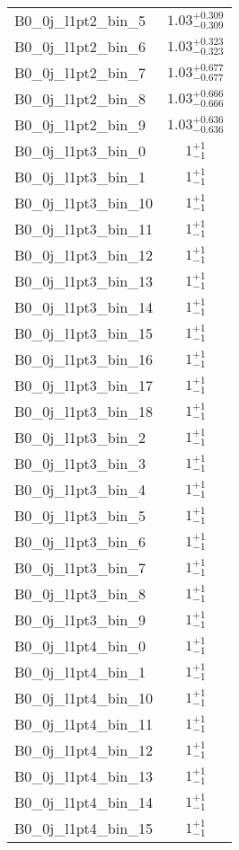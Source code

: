 \begin{tabular}{|l|c|}
B0\_0j\_l1pt2\_bin\_5 & $1.03^{+0.309}_{-0.309}$ \\
B0\_0j\_l1pt2\_bin\_6 & $1.03^{+0.323}_{-0.323}$ \\
B0\_0j\_l1pt2\_bin\_7 & $1.03^{+0.677}_{-0.677}$ \\
B0\_0j\_l1pt2\_bin\_8 & $1.03^{+0.666}_{-0.666}$ \\
B0\_0j\_l1pt2\_bin\_9 & $1.03^{+0.636}_{-0.636}$ \\
B0\_0j\_l1pt3\_bin\_0 & $1^{+1}_{-1}$ \\
B0\_0j\_l1pt3\_bin\_1 & $1^{+1}_{-1}$ \\
B0\_0j\_l1pt3\_bin\_10 & $1^{+1}_{-1}$ \\
B0\_0j\_l1pt3\_bin\_11 & $1^{+1}_{-1}$ \\
B0\_0j\_l1pt3\_bin\_12 & $1^{+1}_{-1}$ \\
B0\_0j\_l1pt3\_bin\_13 & $1^{+1}_{-1}$ \\
B0\_0j\_l1pt3\_bin\_14 & $1^{+1}_{-1}$ \\
B0\_0j\_l1pt3\_bin\_15 & $1^{+1}_{-1}$ \\
B0\_0j\_l1pt3\_bin\_16 & $1^{+1}_{-1}$ \\
B0\_0j\_l1pt3\_bin\_17 & $1^{+1}_{-1}$ \\
B0\_0j\_l1pt3\_bin\_18 & $1^{+1}_{-1}$ \\
B0\_0j\_l1pt3\_bin\_2 & $1^{+1}_{-1}$ \\
B0\_0j\_l1pt3\_bin\_3 & $1^{+1}_{-1}$ \\
B0\_0j\_l1pt3\_bin\_4 & $1^{+1}_{-1}$ \\
B0\_0j\_l1pt3\_bin\_5 & $1^{+1}_{-1}$ \\
B0\_0j\_l1pt3\_bin\_6 & $1^{+1}_{-1}$ \\
B0\_0j\_l1pt3\_bin\_7 & $1^{+1}_{-1}$ \\
B0\_0j\_l1pt3\_bin\_8 & $1^{+1}_{-1}$ \\
B0\_0j\_l1pt3\_bin\_9 & $1^{+1}_{-1}$ \\
B0\_0j\_l1pt4\_bin\_0 & $1^{+1}_{-1}$ \\
B0\_0j\_l1pt4\_bin\_1 & $1^{+1}_{-1}$ \\
B0\_0j\_l1pt4\_bin\_10 & $1^{+1}_{-1}$ \\
B0\_0j\_l1pt4\_bin\_11 & $1^{+1}_{-1}$ \\
B0\_0j\_l1pt4\_bin\_12 & $1^{+1}_{-1}$ \\
B0\_0j\_l1pt4\_bin\_13 & $1^{+1}_{-1}$ \\
B0\_0j\_l1pt4\_bin\_14 & $1^{+1}_{-1}$ \\
B0\_0j\_l1pt4\_bin\_15 & $1^{+1}_{-1}$ \\

\end{tabular}
